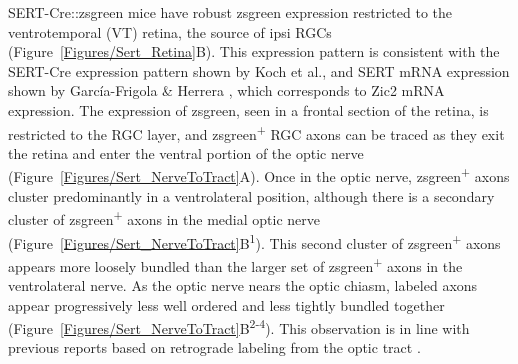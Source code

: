 SERT-Cre::zsgreen mice have robust zsgreen expression restricted to the ventrotemporal (VT) retina, the source of ipsi RGCs (Figure~\ref{Figures/Sert_Retina}B).
This expression pattern is consistent with the SERT-Cre expression pattern shown by Koch et al.,  and SERT mRNA expression shown by Garc\'ia-Frigola \& Herrera , which corresponds to Zic2 mRNA expression. 
The expression of zsgreen, seen in a frontal section of the retina, is restricted to the RGC layer, and zsgreen\textsuperscript{+} RGC axons can be traced as they exit the retina and enter the ventral portion of the optic nerve (Figure~\ref{Figures/Sert_NerveToTract}A).
Once in the optic nerve, zsgreen\textsuperscript{+} axons cluster predominantly in a ventrolateral position, although there is a secondary cluster of zsgreen\textsuperscript{+} axons in the medial optic nerve (Figure~\ref{Figures/Sert_NerveToTract}B\textsuperscript{1}).
This second cluster of zsgreen\textsuperscript{+} axons appears more loosely bundled than the larger set of zsgreen\textsuperscript{+} axons in the ventrolateral nerve.
As the optic nerve nears the optic chiasm, labeled axons appear progressively less well ordered and less tightly bundled together (Figure~\ref{Figures/Sert_NerveToTract}B\textsuperscript{2-4}).
This observation is in line with previous reports based on retrograde labeling from the optic tract \cite{colello1990early}.

